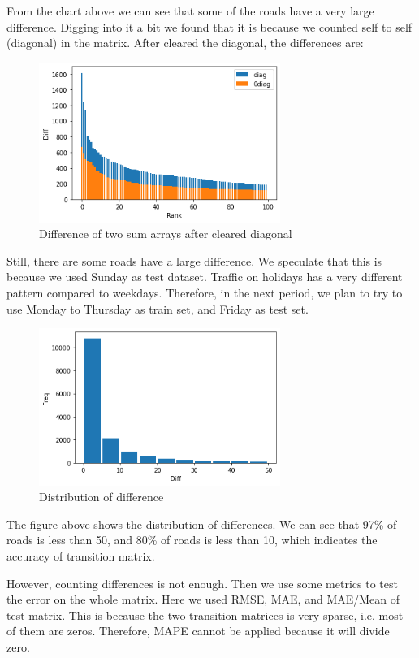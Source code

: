 \documentclass[fontset=none]{ctexart}
\theoremstyle{definition}
\theoremstyle{remark}
\begin{document}
From the chart above we can see that some of the roads have a very large difference.
Digging into it a bit we found that it is because we counted self to self (diagonal) in the matrix.
After cleared the diagonal, the differences are:
\begin{figure}[htb]
  \centering
  \includegraphics[width=0.7\textwidth]{images/8-2-2.png}
  \caption{Difference of two sum arrays after cleared diagonal}
  \label{fig: 822}
\end{figure}

Still, there are some roads have a large difference. We speculate that this is because we used Sunday as test dataset.
Traffic on holidays has a very different pattern compared to weekdays. Therefore, in the next period, we plan
to try to use Monday to Thursday as train set, and Friday as test set.

\clearpage
\begin{figure}[htb]
  \centering
  \includegraphics[width=0.7\textwidth]{images/8-2-5.png}
  \caption{Distribution of difference}
  \label{fig: 823}
\end{figure}
The figure above shows the distribution of differences. 
We can see that 97\% of roads is less than 50, and 80\% of roads is less than 10, which indicates
the accuracy of transition matrix.

However, counting differences is not enough. Then we use some metrics to test the error on the whole matrix.
Here we used RMSE, MAE, and MAE/Mean of test matrix. This is because the two transition matrices is very sparse,
i.e. most of them are zeros. Therefore, MAPE cannot be applied because it will divide zero.
\end{document}
